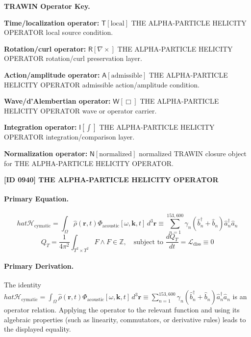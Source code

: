 \par\vspace{0.45\baselineskip}
\noindent\begin{minipage}[t]{\linewidth}
\begingroup
\small
\raggedright
\textbf{TRAWIN Operator Key.}\par
\noindent\textbf{Time/localization operator:} $\mathsf{T}\!\left[\mathrm{local}\right]$ THE ALPHA-PARTICLE HELICITY OPERATOR local source condition.\par
\noindent\textbf{Rotation/curl operator:} $\mathsf{R}\!\left[\nabla\times\right]$ THE ALPHA-PARTICLE HELICITY OPERATOR rotation/curl preservation layer.\par
\noindent\textbf{Action/amplitude operator:} $\mathsf{A}\!\left[\mathrm{admissible}\right]$ THE ALPHA-PARTICLE HELICITY OPERATOR admissible action/amplitude condition.\par
\noindent\textbf{Wave/d'Alembertian operator:} $\mathsf{W}\!\left[\Box\right]$ THE ALPHA-PARTICLE HELICITY OPERATOR wave or operator carrier.\par
\noindent\textbf{Integration operator:} $\mathsf{I}\!\left[\int\right]$ THE ALPHA-PARTICLE HELICITY OPERATOR integration/comparison layer.\par
\noindent\textbf{Normalization operator:} $\mathsf{N}\!\left[\mathrm{normalized}\right]$ normalized TRAWIN closure object for THE ALPHA-PARTICLE HELICITY OPERATOR.\par
\endgroup
\end{minipage}

\clearpage
\noindent\textbf{[ID 0940] THE ALPHA-PARTICLE HELICITY OPERATOR}\par
\vspace{0.35em}
\paragraph{Primary Equation.}
\[
hat{\mathcal{H}}_{\text{cymatic}} = \int_{\Omega} \hat{\rho}(\mathbf{r}, t) \Phi_{\text{acoustic}}[\omega, \mathbf{k}, t] \, d^3\mathbf{r} \equiv \sum_{n=1}^{153,600} \gamma_n (\hat{b}_n^\dagger + \hat{b}_n) \hat{a}_n^\dagger \hat{a}_n
\]
\[
Q_T = \frac{1}{4\pi^2} \int_{T^2 \times T^2} F \wedge F \in \mathbb{Z}, \quad \text{subject to } \frac{dQ_T}{dt} = \mathcal{L}_{\text{diss}} \equiv 0
\]

\paragraph{Primary Derivation.}
The identity \( hat{\mathcal{H}}_{\text{cymatic}} = \int_{\Omega} \hat{\rho}(\mathbf{r}, t) \Phi_{\text{acoustic}}[\omega, \mathbf{k}, t] \, d^3\mathbf{r} \equiv \sum_{n=1}^{153,600} \gamma_n (\hat{b}_n^\dagger + \hat{b}_n) \hat{a}_n^\dagger \hat{a}_n \) is an operator relation. Applying the operator to the relevant function and using its algebraic properties (such as linearity, commutators, or derivative rules) leads to the displayed equality.
